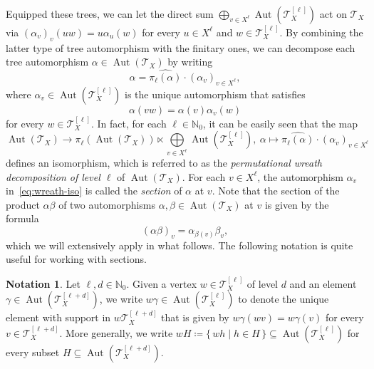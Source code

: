 \documentclass[a4paper]{amsart}
\numberwithin{equation}{section}
\theoremstyle{definition}
\newtheorem{notation}[theorem]{Notation}
\theoremstyle{remark}
\newcommand{\N}{\mathbb{N}}
\DeclareMathOperator{\Aut}{Aut}
\newcommand\Set[2]{\{\,#1\mid#2\,\}}
\newcommand{\T}{\mathcal{T}}
\newcommand{\defeq}\coloneqq%
\begin{document}
Equipped these trees, we can let the direct sum $\bigoplus %
_{v \in X^{\ell}} \Aut(\T_X^{[\ell]})$ act on $\T_X$ via $(\alpha_v)_{v}(uw) = u \alpha_{u}(w)$ for every $u \in X^{\ell}$ and $w \in \T_X^{[\ell]}$.
By combining the latter type of tree automorphism with the finitary ones, we can decompose each tree automorphism $\alpha \in \Aut(\T_X)$ by writing
\[
\alpha = \widehat{\pi_{\ell}(\alpha)} \cdot (\alpha_v)_{v \in X^{\ell}},
\]
where $\alpha_v \in \Aut(\T_X^{[\ell]})$ is the unique automorphism that satisfies 
\[
\alpha(vw) = \alpha(v) \alpha_v(w)
\]
for every $w \in \T_X^{[\ell]}$.
In fact, for each $\ell\in \mathbb N_0$, it can be easily seen that the map
\begin{equation}\label{eq:wreath-iso}
  \Aut(\T_X) \rightarrow \widehat{\pi_{\ell}(\Aut(\T_X))} \ltimes \bigoplus \limits_{v \in X^{\ell}} \Aut(\T_X^{[\ell]}),\ 
  \alpha \mapsto \widehat{\pi_{\ell}(\alpha)} \cdot (\alpha_v)_{v \in X^{\ell}}
\end{equation}
defines an isomorphism, which is referred to as the \emph{permutational wreath decomposition of level $\ell$} of $\Aut(\T_X)$.
For each $v \in X^{\ell}$, the automorphism $\alpha_v$ in~\eqref{eq:wreath-iso} is called the \emph{section} of $\alpha$ at $v$.
Note that the section of the product $\alpha \beta$ of two automorphisms $\alpha,\beta \in \Aut(\T_X)$ at $v$ is given by the formula
\begin{equation}\label{eq:section-formula}
(\alpha \beta)_v = \alpha_{\beta(v)} \beta_v,
\end{equation}
which we will extensively apply in what follows.
The following notation is quite useful for working with sections.

\begin{notation}\label{not:v-gamma}
Let $\ell,d \in \N_0$.
Given a vertex $w \in \T_X^{[\ell]}$ of level $d$ and an element $\gamma \in \Aut(\T_X^{[\ell+d]})$, we write $w\gamma \in \Aut(\T_X^{[\ell]})$ to denote the unique element with support in $w\T_X^{[\ell+d]}$ that is given by $w\gamma(wv) = w\gamma(v)$ for every $v \in \T_X^{[\ell+d]}$.
More generally, we write $wH \defeq \Set{wh}{h \in H} \subseteq \Aut(\T_X^{[\ell]})$ for every subset $H \subseteq \Aut(\T_X^{[\ell+d]})$.
\end{notation}
\end{document}
